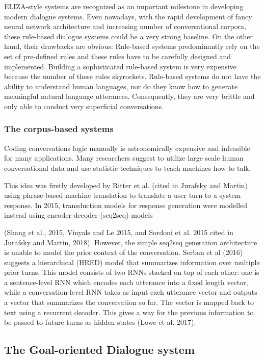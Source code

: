 \documentclass[bsc,frontabs,twoside,singlespacing,parskip,deptreport]{infthesis}     %
\begin{document}
ELIZA-style systems are recognized as an important milestone in developing modern dialogue systems. Even nowadays, with the rapid development of fancy neural network architecture and increasing number of conversational corpora, these rule-based dialogue systems could be a very strong baseline. On the other hand, their drawbacks are obvious: Rule-based systems predominantly rely on the set of pre-defined rules and these rules have to be carefully designed and implemented. Building a sophisticated rule-based system is very expensive because the number of these rules skyrockets. Rule-based systems do not have the ability to understand human languages, nor do they know how to generate meaningful natural language utterances. Consequently, they are very brittle and only able to conduct very superficial conversations.

\subsubsection*{The corpus-based systems}

Coding conversations logic manually is astronomically expensive and infeasible for many applications. Many researchers suggest to utilize large scale human conversational data and use statistic techniques to teach machines how to talk.

 This idea was firstly developed by Ritter et al. (cited in Jurafsky and Martin\cite{jurafsky2019speech}) using phrase-based machine translation to translate a user turn to a system response. In 2015, transduction models for response generation were modelled instead using encoder-decoder (seq2seq) models
 
 
 (Shang et al., 2015, Vinyals and Le 2015, and Sordoni et al. 2015 cited in Jurafsky and Martin, 2018). However, the simple seq2seq generation architecture is unable to model the prior context of the conversation. Serban et al (2016) suggests a hierarchical (HRED) model that summarizes information over multiple prior turns. This model consists of two RNNs stacked on top of each other: one is a sentence-level RNN which encodes each utterance into a fixed length vector, while a conversation-level RNN takes as input each utterance vector and outputs a vector that summarizes the conversation so far. The vector is mapped back to text using a recurrent decoder. This gives a way for the previous information to be passed to future turns as hidden states (Lowe et al. 2017).



\subsection{The Goal-oriented Dialogue system}
\end{document}
